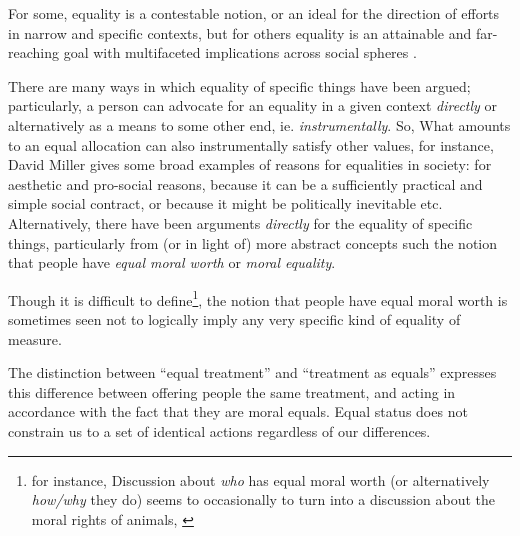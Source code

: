 For some, equality is a contestable notion, or an ideal for the direction of efforts in narrow and specific contexts, but for others equality is an attainable and far-reaching goal with multifaceted implications across social spheres \cite{walzer2008spheres,millerandwalzer,baker1992arguing}.

There are many ways in which equality of specific things have been argued; particularly, a person can advocate for an equality in a given context \textit{directly} or alternatively as a means to some other end, ie. \textit{instrumentally}.
So, What amounts to an equal allocation can also instrumentally satisfy other values, for instance, David Miller \cite{equalityandjustice:1998} %
gives some broad examples of reasons for equalities in society: for aesthetic and pro-social reasons, because it can be a sufficiently practical and simple social contract, or because it might be politically inevitable etc.
Alternatively, there have been arguments \textit{directly} for the equality of specific things, particularly from (or in light of) more abstract concepts such the notion that people have \textit{equal moral worth} \cite{doallpersonshaveequalmoralworth} or \textit{moral equality}.

Though it is difficult to define\footnote{for instance, Discussion about \textit{who} has equal moral worth (or alternatively \textit{how/why} they do) seems to occasionally to turn into a discussion about the moral rights of animals, \cite{doallpersonshaveequalmoralworth}}, the notion that people have equal moral worth is sometimes seen not to logically imply any very specific kind of equality of measure.
\begin{displayquote}
The distinction between ``equal treatment'' and ``treatment as equals'' expresses this difference between offering people the same treatment, and acting in accordance with the fact that they are moral equals. Equal status does not constrain us to a set of identical actions regardless of our differences.\cite{whatisbasicequalitynathan}
\end{displayquote}

